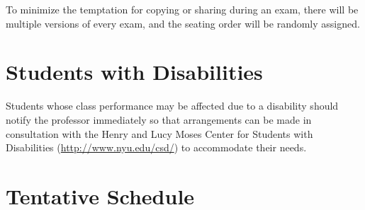 \documentclass[11pt]{article}
\begin{document}
\noindent To minimize the temptation for copying or sharing during
an exam, there will be multiple versions of every exam, and the seating order
will be randomly assigned.


\section*{Students with Disabilities}

Students whose class performance may be affected due to a disability should
notify the professor immediately so that arrangements can be made in
consultation with the Henry and Lucy Moses Center for Students with
Disabilities (\url{http://www.nyu.edu/csd/}) to accommodate their needs.


\newpage

\section*{Tentative Schedule}
\end{document}
